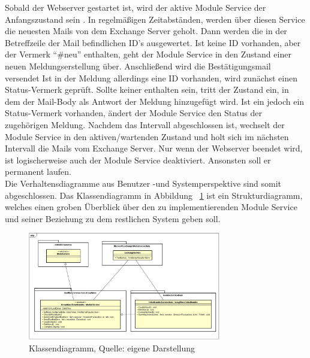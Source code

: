 \noindent
Sobald der Webserver gestartet ist, wird  der aktive Module Service der Anfangszustand sein . In regelmäßigen Zeitabständen, werden über diesen Service die neuesten Mails von dem Exchange Server geholt. Dann werden die in der Betreffzeile der Mail befindlichen ID's ausgewertet. Ist keine ID vorhanden, aber der Vermerk \enquote{\#neu} enthalten, geht der Module Service in den Zustand einer neuen Meldungserstellung über. Anschließend wird die Bestätigungsmail versendet\newline
Ist in der Meldung allerdings eine ID vorhanden, wird zunächst einen Status-Vermerk geprüft. Sollte keiner enthalten sein, tritt der Zustand ein, in dem der Mail-Body als Antwort der Meldung hinzugefügt wird. Ist ein jedoch ein Status-Vermerk vorhanden, ändert der Module Service den Status der zugehörigen Meldung.\newline
Nachdem das Intervall abgeschlossen ist, wechselt der Module Service in den aktiven/wartenden Zustand und holt sich im nächsten Intervall die Mails vom Exchange Server. Nur wenn der Webserver beendet wird, ist logischerweise auch der Module Service deaktiviert. Ansonsten soll er permanent laufen.\\

\noindent
Die Verhaltensdiagramme aus Benutzer -und Systemperspektive sind somit abgeschlossen. Das Klassendiagramm in Abbildung ~\ref{fig:Klassendiagramm} ist ein Strukturdiagramm, welches einen groben Überblick über den zu implementierenden Module Service und seiner Beziehung zu dem restlichen System geben soll. 

\begin{figure}[h!]
\centering
\includegraphics[width=0.75\textwidth]{Abbildungen/Klassendiagramm.png}
	\caption[Klassendiagramm]{Klassendiagramm, Quelle: eigene Darstellung}
	\label{fig:Klassendiagramm}
\end{figure}

